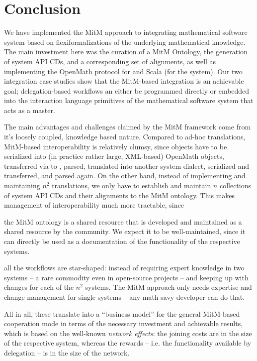 \section{Conclusion}\label{sec:concl}
We have implemented the MitM approach to integrating mathematical software system based on
flexiformalizations of the underlying mathematical knowledge. The main investment here was
the curation of a MitM Ontology, the generation of system API CDs, and a corresponding set
of alignments, as well as implementing the OpenMath \SCSCP protocol for \Python and Scala
(for the \MMT system). Our two integration case studies show that the MitM-based
integration is an achievable goal; delegation-based workflows an either be programmed
directly or embedded into the interaction language primitives of the mathematical software
system that acts as a master. 

The main advantages and challenges claimed by the MitM framework come from it's loosely
coupled, knowledge based nature. Compared to ad-hoc translations, MitM-based
interoperability is relatively clumsy, since objects have to be serialized into (in
practice rather large, XML-based) OpenMath objects, transferred via \SCSCP to \MMT, parsed,
translated into another system dialect, serialized and transferred, and parsed again. On
the other hand, instead of implementing and maintaining $n^2$ translations, we only have
to establish and maintain $n$ collections of system API CDs and their alignments to the
MitM ontology. This makes management of interoperability much more tractable, since
\begin{compactenum}
\item the MitM ontology is a shared resource that is developed and maintained as a shared
  resource by the community. We expect it to be well-maintained, since it can directly be
  used as a documentation of the functionality of the respective systems.
\item all the workflows are star-shaped: instead of requiring expert knowledge in two
  systems -- a rare commodity even in open-source projects -- and keeping up with changes
  for each of the $n^2$ systems. The MitM approach only needs expertise and change
  management for single systems -- any math-savy developer can do that.
\end{compactenum}
All in all, these translate into a ``business model'' for the general MitM-based
cooperation mode in terms of the necessary investment and achievable results, which is
based on the well-known \emph{network effects}: the joining costs are in the size of the
respective system, whereas the rewards -- i.e. the functionality available by delegation
-- is in the size of the network.

